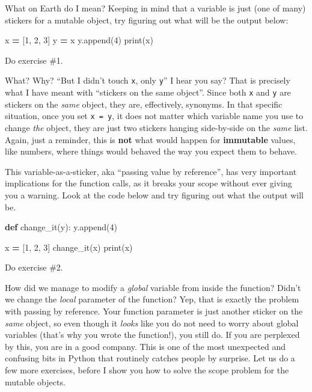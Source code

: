 \documentclass[
]{book}
\newenvironment{Shaded}{\begin{snugshade}}{\end{snugshade}}
\newcommand{\BuiltInTok}[1]{#1}
\newcommand{\DecValTok}[1]{\textcolor[rgb]{0.00,0.00,0.81}{#1}}
\newcommand{\KeywordTok}[1]{\textcolor[rgb]{0.13,0.29,0.53}{\textbf{#1}}}
\newcommand{\NormalTok}[1]{#1}
\newcommand{\OperatorTok}[1]{\textcolor[rgb]{0.81,0.36,0.00}{\textbf{#1}}}
\begin{document}
What on Earth do I mean? Keeping in mind that a variable is just (one of many) stickers for a mutable object, try figuring out what will be the output below:

\begin{Shaded}
\begin{Highlighting}[]
\NormalTok{x }\OperatorTok{=}\NormalTok{ [}\DecValTok{1}\NormalTok{, }\DecValTok{2}\NormalTok{, }\DecValTok{3}\NormalTok{]}
\NormalTok{y }\OperatorTok{=}\NormalTok{ x}
\NormalTok{y.append(}\DecValTok{4}\NormalTok{)}
\BuiltInTok{print}\NormalTok{(x)}
\end{Highlighting}
\end{Shaded}

Do exercise \#1.

What? Why? ``But I didn't touch \texttt{x}, only \texttt{y}'' I hear you say? That is precisely what I have meant with ``stickers on the same object''. Since both \texttt{x} and \texttt{y} are stickers on the \emph{same} object, they are, effectively, synonyms. In that specific situation, once you set \texttt{x\ =\ y}, it does not matter which variable name you use to change \emph{the} object, they are just two stickers hanging side-by-side on the \emph{same} list. Again, just a reminder, this is \textbf{not} what would happen for \textbf{immutable} values, like numbers, where things would behaved the way you expect them to behave.

This variable-as-a-sticker, aka ``passing value by reference'', has very important implications for the function calls, as it breaks your scope without ever giving you a warning. Look at the code below and try figuring out what the output will be.

\begin{Shaded}
\begin{Highlighting}[]
\KeywordTok{def}\NormalTok{ change\_it(y):}
\NormalTok{    y.append(}\DecValTok{4}\NormalTok{)}

\NormalTok{x }\OperatorTok{=}\NormalTok{ [}\DecValTok{1}\NormalTok{, }\DecValTok{2}\NormalTok{, }\DecValTok{3}\NormalTok{]}
\NormalTok{change\_it(x)}
\BuiltInTok{print}\NormalTok{(x)}
\end{Highlighting}
\end{Shaded}

Do exercise \#2.

How did we manage to modify a \emph{global} variable from inside the function? Didn't we change the \emph{local} parameter of the function? Yep, that is exactly the problem with passing by reference. Your function parameter is just another sticker on the \emph{same} object, so even though it \emph{looks} like you do not need to worry about global variables (that's why you wrote the function!), you still do. If you are perplexed by this, you are in a good company. This is one of the most unexpected and confusing bits in Python that routinely catches people by surprise. Let us do a few more exercises, before I show you how to solve the scope problem for the mutable objects.
\end{document}
